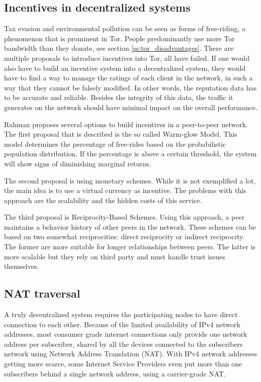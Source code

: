 \documentclass{article}
\begin{document}
	\subsection{Incentives in decentralized systems}
		Tax evasion and environmental pollution can be seen as forms of free-riding, a phenomenon that is prominent in Tor. People predominantly use more Tor bandwidth than they donate, see section \ref{ss:tor_disadvantages}. There are multiple proposals \cite{dingledine2010building, jansen13lira} to introduce incentives into Tor, all have failed. If one would also have to build an incentive system into a decentralized system, they would have to find a way to manage the ratings of each client in the network, in such a way that they cannot be falsely modified. In other words, the reputation data has to be accurate and reliable. Besides the integrity of this data, the traffic it generates on the network should have minimal impact on the overall performance.
		
		Rahman \cite{rahman2009survey} proposes several options to build incentives in a peer-to-peer network. The first proposal that is described is the so called Warm-glow Model. This model determines the percentage of free-rides based on the probabilistic population distribution. If the percentage is above a certain threshold, the system will show signs of diminishing marginal returns.
		
		The second proposal is using monetary schemes. While it is not exemplified a lot, the main idea is to use a virtual currency as incentive. The problems with this approach are the scalability and the hidden costs of this service.
		
		The third proposal is Reciprocity-Based Schemes. Using this approach, a peer maintains a behavior history of other peers in the network. These schemes can be based on two somewhat reciprocities: direct reciprocity or indirect reciprocity. The former are more suitable for longer relationships between peers. The latter is more scalable but they rely on third party and must handle trust issues themselves.
		
	\subsection{NAT traversal}
		A truly decentralized system requires the participating nodes to have direct connection to each other. Because of the limited availability of IPv4 network addresses, most consumer grade internet connections only provide one network address per subscriber, shared by all the devices connected to the subscribers network using Network Address Translation (NAT). With IPv4 network addresses getting more scarce, some Internet Service Providers even put more than one subscribers behind a single network address, using a carrier-grade NAT.
		
\end{document}
